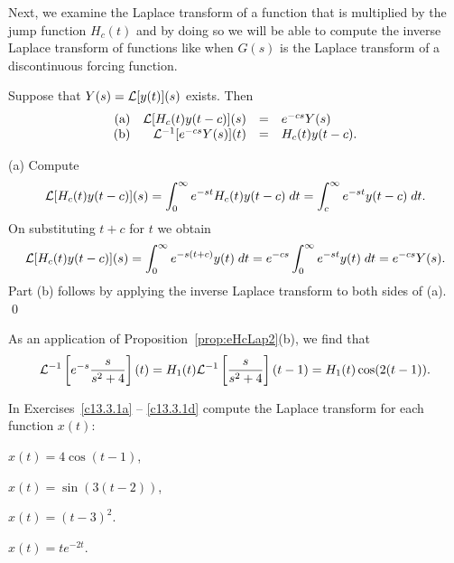 \documentclass{ximera}
\begin{document}
Next, we examine the Laplace transform of a function that is multiplied 
by the jump function $H_c(t)$ and by doing so we will be able to compute the
inverse Laplace transform of functions like  when $G(s)$ is the 
Laplace transform of a discontinuous forcing function.

\begin{prop}  \label{prop:eHcLap2}
Suppose that $Y(s)={\cal L}[y(t)](s)$ exists.  Then
\[
\begin{array}{rrcl}
\mbox{(a)} & {\cal L}[H_c(t)y(t-c)](s) & = & e^{-cs} Y(s) \\
\mbox{(b)} & {\cal L}^{-1}[e^{-cs}Y(s)](t) & = & H_c(t)y(t-c).
\end{array}
\]
\end{prop}

\proof (a)  Compute
\[
{\cal L}[H_c(t)y(t-c)](s) = \int_0^{\infty} e^{-st}H_c(t) y(t-c)\; dt
= \int_c^{\infty} e^{-st}y(t-c)\; dt.
\]
On substituting $t+c$ for $t$ we obtain
\[
{\cal L}[H_c(t)y(t-c)](s)=\int_0^{\infty} e^{-s(t+c)}y(t)\; dt
=e^{-cs} \int_0^{\infty} e^{-st}y(t)\; dt
=e^{-cs} Y(s).
\]
Part (b) follows by applying the inverse Laplace transform to both sides 
of (a).  \qed

As an application of Proposition~\ref{prop:eHcLap2}(b), we find that
\[
{\cal L}^{-1}\left[ e^{-s}\frac{s}{s^2+4}\right](t)=
H_1(t){\cal L}^{-1}\left[ \frac{s}{s^2+4}\right](t-1)=
H_1(t)\cos(2(t-1)).
\]

\EXER

\TEXER

\noindent In Exercises~\ref{c13.3.1a} -- \ref{c13.3.1d} compute the Laplace 
transform for each function $x(t)$:
\begin{exercise} \label{c13.3.1a}
$x(t) = 4\cos(t-1)$,
\end{exercise}
\begin{exercise} \label{c13.3.1b}
$x(t) = \sin(3(t-2))$,
\end{exercise}
\begin{exercise} \label{c13.3.1c}
$x(t) = (t-3)^2$.
\end{exercise}
\begin{exercise} \label{c13.3.1d}
$x(t) = te^{-2t}$.
\end{exercise}
\end{document}
